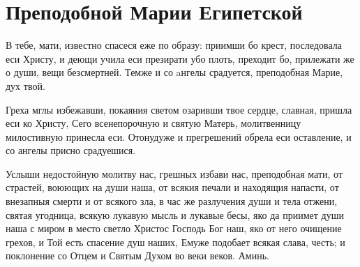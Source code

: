 \section{Преподобной Марии  Египетской}\begin{mymulticols}


В тебе, мати, известно спасеся еже по образу: приимши бо крест, последовала еси Христу, и деющи учила еси презирати убо плоть, преходит бо, прилежати же о души, вещи безсмертней. Темже и со aнгелы срадуется, преподобная Марие, дух твой.


Греха мглы избежавши, покаяния светом озаривши твое сердце, славная, пришла еси ко Христу, Сего всенепорочную и святую Матерь, молитвенницу милостивную принесла еси. Отонудуже и прегрешений обрела еси оставление, и со ангелы присно срадуешися.


Услыши недостойную молитву нас, грешных  избави нас, преподобная мати, от страстей, воюющих на души наша, от всякия печали и находящия напасти, от внезапныя смерти и от всякого зла, в час же разлучения души и тела отжени, святая угодница, всякую лукавую мысль и лукавые бесы, яко да приимет души наша с миром в место светло Христос Господь Бог наш, яко от него очищение грехов, и Той есть спасение душ наших, Емуже подобает всякая слава, честь; и поклонение со Отцем и Святым Духом во веки веков. Аминь.

\end{mymulticols}

